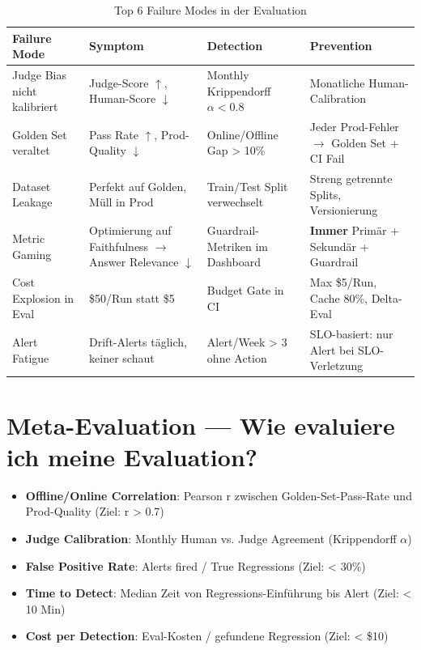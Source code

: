 \begin{table}[H]
\centering
\begin{tabularx}{\linewidth}{lXXX}
\toprule
\textbf{Failure Mode} & \textbf{Symptom} & \textbf{Detection} & \textbf{Prevention} \\
\midrule
Judge Bias nicht kalibriert & Judge-Score $\uparrow$, Human-Score $\downarrow$ & Monthly Krippendorff $\alpha < 0.8$ & Monatliche Human-Calibration \\
Golden Set veraltet & Pass Rate $\uparrow$, Prod-Quality $\downarrow$ & Online/Offline Gap > 10\% & Jeder Prod-Fehler $\to$ Golden Set + CI Fail \\
Dataset Leakage & Perfekt auf Golden, Müll in Prod & Train/Test Split verwechselt & Streng getrennte Splits, Versionierung \\
Metric Gaming & Optimierung auf Faithfulness $\to$ Answer Relevance $\downarrow$ & Guardrail-Metriken im Dashboard & \textbf{Immer} Primär + Sekundär + Guardrail \\
Cost Explosion in Eval & \$50/Run statt \$5 & Budget Gate in CI & Max \$5/Run, Cache 80\%, Delta-Eval \\
Alert Fatigue & Drift-Alerts täglich, keiner schaut & Alert/Week > 3 ohne Action & SLO-basiert: nur Alert bei SLO-Verletzung \\
\bottomrule
\end{tabularx}
\caption{Top 6 Failure Modes in der Evaluation}
\end{table}

\section{Meta-Evaluation — Wie evaluiere ich meine Evaluation?}

\begin{itemize}
    \item \textbf{Offline/Online Correlation}: Pearson r zwischen Golden-Set-Pass-Rate und Prod-Quality (Ziel: r > 0.7)
    \item \textbf{Judge Calibration}: Monthly Human vs. Judge Agreement (Krippendorff $\alpha$)
    \item \textbf{False Positive Rate}: Alerts fired / True Regressions (Ziel: < 30\%)
    \item \textbf{Time to Detect}: Median Zeit von Regressions-Einführung bis Alert (Ziel: < 10 Min)
    \item \textbf{Cost per Detection}: Eval-Kosten / gefundene Regression (Ziel: < \$10)
\end{itemize}

